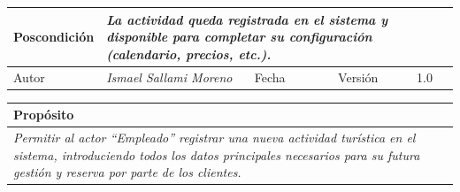 \begin{table}[H]
\begin{tabular}{llllllll}
        \multicolumn{1}{|l|}{Poscondición}                           & \multicolumn{7}{p{10cm}|}{{\color[HTML]{808080} \textit{La actividad queda registrada en el sistema y disponible para completar su configuración (calendario, precios, etc.).}}}                                                                                                                                                                                                                                                       \\ \hline
        \multicolumn{1}{|l|}{Autor}                                  & \multicolumn{1}{l|}{{\color[HTML]{808080} \textit{Ismael Sallami Moreno}}}                           & \multicolumn{2}{l|}{Fecha}                                                   & \multicolumn{1}{l|}{}                          & \multicolumn{2}{l|}{Versión}                                                      & \multicolumn{1}{l|}{1.0}                                                     \\ \hline
        \end{tabular}
        \end{table}

        \begin{table}[H]
            \begin{tabular}{llllllll}
        \hline
        \multicolumn{8}{|l|}{\cellcolor[HTML]{F2F2F2}Propósito}                                                                                                                                                                                                                                                                                                                                                                                           \\ \hline
        \multicolumn{8}{|p{15cm}|}{{\color[HTML]{808080} \textit{Permitir al actor “Empleado” registrar una nueva actividad turística en el sistema, introduciendo todos los datos principales necesarios para su futura gestión y reserva por parte de los clientes.}}}                                                                                                                                                                                                             \\ \hline
        \end{tabular}
        \end{table}

